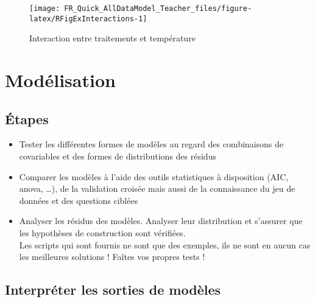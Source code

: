 \documentclass[french,a4paper]{article}
\providecommand{\tightlist}{%
  \setlength{\itemsep}{0pt}\setlength{\parskip}{0pt}}
\begin{document}
\begin{figure}[!h]

{\centering \texttt{[image: FR\_Quick\_AllDataModel\_Teacher\_files/figure-latex/RFigExInteractions-1]} 

}

\caption{Interaction entre traitements et température}\label{fig:RFigExInteractions}
\end{figure}

\section{Modélisation}\label{modelisation}

\subsection{Étapes}\label{etapes-1}


\begin{itemize}
\tightlist
\item
  Tester les différentes formes de modèles au regard des combinaisons de
  covariables et des formes de distributions des résidus
\item
  Comparer les modèles à l'aide des outils statistiques à disposition
  (AIC, anova, \ldots{}), de la validation croisée mais aussi de la
  connaissance du jeu de données et des questions ciblées
\item
  Analyser les résidus des modèles. Analyser leur distribution et
  s'assurer que les hypothèses de construction sont vérifiées.\\
  \nopandoc{\begin{redbox}} Les scripts qui sont fournis ne sont que des
  exemples, ils ne sont en aucun cas les meilleures solutions ! Faîtes
  vos propres tests ! \nopandoc{\end{redbox}}
\end{itemize}

\subsection{Interpréter les sorties de
modèles}\label{interpreter-les-sorties-de-modeles}
\end{document}

